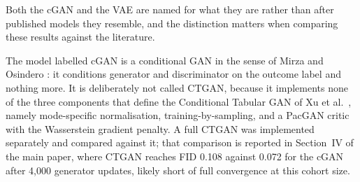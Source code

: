 \documentclass[journal,onecolumn]{IEEEtran}
\begin{document}
\begin{table}[!t]
  \centering
  \caption{Complete Architecture and Optimiser Settings for the Three Generative Models}
  \label{tab:arch}
\end{table}

Both the cGAN and the VAE are named for what they are rather than after published models they resemble, and the distinction matters when comparing these results against the literature.

The model labelled cGAN is a conditional GAN in the sense of Mirza and Osindero \cite{mirza2014}: it conditions generator and discriminator on the outcome label and nothing more. It is deliberately not called CTGAN, because it implements none of the three components that define the Conditional Tabular GAN of Xu et al.\ \cite{xu2019}, namely mode-specific normalisation, training-by-sampling, and a PacGAN critic with the Wasserstein gradient penalty. A full CTGAN was implemented separately and compared against it; that comparison is reported in Section~IV of the main paper, where CTGAN reaches FID 0.108 against 0.072 for the cGAN after 4{,}000 generator updates, likely short of full convergence at this cohort size.
\end{document}
